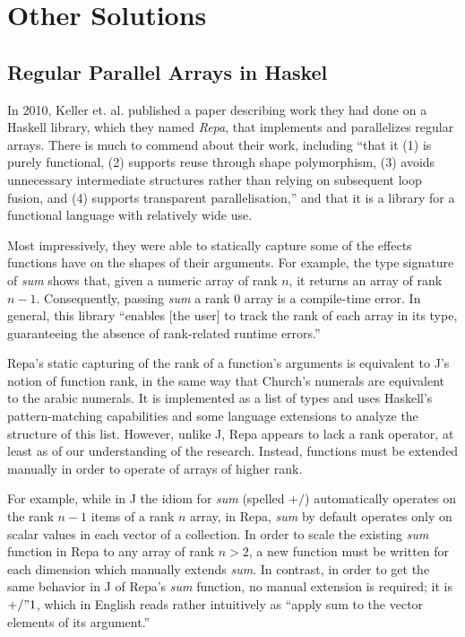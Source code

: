 \section{Other Solutions}
\subsection{Regular Parallel Arrays in Haskel}\cite{dph}
In 2010, Keller et. al. published a paper 
describing work they had done on a Haskell library, which they named \textit{Repa}, that implements and parallelizes regular arrays.
There is much to commend about their work, including ``that it (1) is purely
functional, (2) supports reuse through shape polymorphism, (3)
avoids unnecessary intermediate structures rather than relying on
subsequent loop fusion, and (4) supports transparent parallelisation,''
and that it is a library for a functional language with relatively wide use.

Most impressively, they were able to statically capture some of the effects functions have on the shapes of their arguments.
For example, the type signature of \textit{sum} shows that, given a numeric array of rank $n$, 
it returns an array of rank $n-1$.
Consequently, passing \textit{sum} a rank 0 array is a compile-time error.
In general, this library ``enables [the user] to track the rank of each array in its type,
guaranteeing the absence of rank-related runtime errors.''

Repa's static capturing of the rank of a function's arguments is equivalent to J's notion of function rank, 
in the same way that Church's numerals are equivalent to the arabic numerals. 
It is implemented as a list of types and uses Haskell's pattern-matching capabilities and some language extensions 
to analyze the structure of this list.
However, unlike J, Repa appears to lack a rank operator, at least as of our understanding of the research.
Instead, functions must be extended manually in order to operate of arrays of higher rank.

For example, while in J the idiom for \textit{sum} (spelled $+/$) automatically operates on the rank $n-1$ items of a rank $n$ array, 
in Repa, \textit{sum} by default operates only on scalar values in each vector of a collection.
In order to scale the existing \textit{sum} function in Repa to any array of rank $n > 2$, 
a new function must be written for each dimension which manually extends \textit{sum}.
In contrast, in order to get the same behavior in J of Repa's \textit{sum} function, no manual extension is required; 
it is $+/ " 1$, which in English reads rather intuitively as ``apply sum to the vector elements of its argument.''

